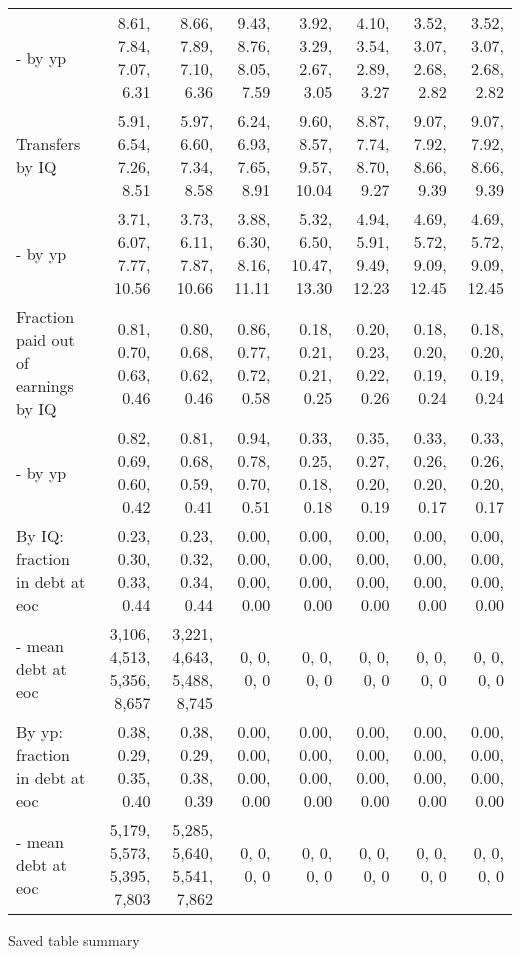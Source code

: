 \begin{tabular}{lrrrrrrr}
- by yp & 8.61, 7.84, 7.07, 6.31  & 8.66, 7.89, 7.10, 6.36  & 9.43, 8.76, 8.05, 7.59  & 3.92, 3.29, 2.67, 3.05  & 4.10, 3.54, 2.89, 3.27  & 3.52, 3.07, 2.68, 2.82  & 3.52, 3.07, 2.68, 2.82  \\
Transfers by IQ & 5.91, 6.54, 7.26, 8.51  & 5.97, 6.60, 7.34, 8.58  & 6.24, 6.93, 7.65, 8.91  & 9.60, 8.57, 9.57, 10.04  & 8.87, 7.74, 8.70, 9.27  & 9.07, 7.92, 8.66, 9.39  & 9.07, 7.92, 8.66, 9.39  \\
- by yp & 3.71, 6.07, 7.77, 10.56  & 3.73, 6.11, 7.87, 10.66  & 3.88, 6.30, 8.16, 11.11  & 5.32, 6.50, 10.47, 13.30  & 4.94, 5.91, 9.49, 12.23  & 4.69, 5.72, 9.09, 12.45  & 4.69, 5.72, 9.09, 12.45  \\
Fraction paid out of earnings by IQ & 0.81, 0.70, 0.63, 0.46  & 0.80, 0.68, 0.62, 0.46  & 0.86, 0.77, 0.72, 0.58  & 0.18, 0.21, 0.21, 0.25  & 0.20, 0.23, 0.22, 0.26  & 0.18, 0.20, 0.19, 0.24  & 0.18, 0.20, 0.19, 0.24  \\
- by yp & 0.82, 0.69, 0.60, 0.42  & 0.81, 0.68, 0.59, 0.41  & 0.94, 0.78, 0.70, 0.51  & 0.33, 0.25, 0.18, 0.18  & 0.35, 0.27, 0.20, 0.19  & 0.33, 0.26, 0.20, 0.17  & 0.33, 0.26, 0.20, 0.17  \\
By IQ: fraction in debt at eoc & 0.23, 0.30, 0.33, 0.44  & 0.23, 0.32, 0.34, 0.44  & 0.00, 0.00, 0.00, 0.00  & 0.00, 0.00, 0.00, 0.00  & 0.00, 0.00, 0.00, 0.00  & 0.00, 0.00, 0.00, 0.00  & 0.00, 0.00, 0.00, 0.00  \\
- mean debt at eoc & 3,106, 4,513, 5,356, 8,657  & 3,221, 4,643, 5,488, 8,745  & 0, 0, 0, 0  & 0, 0, 0, 0  & 0, 0, 0, 0  & 0, 0, 0, 0  & 0, 0, 0, 0  \\
By yp: fraction in debt at eoc & 0.38, 0.29, 0.35, 0.40  & 0.38, 0.29, 0.38, 0.39  & 0.00, 0.00, 0.00, 0.00  & 0.00, 0.00, 0.00, 0.00  & 0.00, 0.00, 0.00, 0.00  & 0.00, 0.00, 0.00, 0.00  & 0.00, 0.00, 0.00, 0.00  \\
- mean debt at eoc & 5,179, 5,573, 5,395, 7,803  & 5,285, 5,640, 5,541, 7,862  & 0, 0, 0, 0  & 0, 0, 0, 0  & 0, 0, 0, 0  & 0, 0, 0, 0  & 0, 0, 0, 0  \\
\hline
\end{tabular}%
Saved table summary

